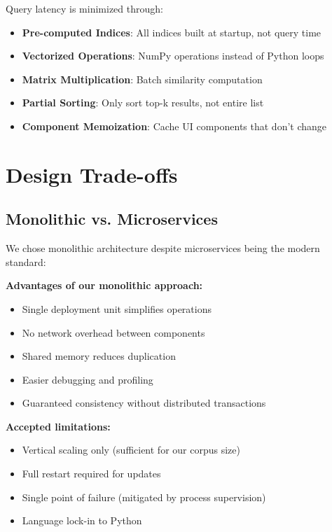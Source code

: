 Query latency is minimized through:

\begin{itemize}[leftmargin=*,itemsep=2pt,topsep=2pt]
  \item \textbf{Pre-computed Indices}: All indices built at startup, not query time
  \item \textbf{Vectorized Operations}: NumPy operations instead of Python loops
  \item \textbf{Matrix Multiplication}: Batch similarity computation
  \item \textbf{Partial Sorting}: Only sort top-k results, not entire list
  \item \textbf{Component Memoization}: Cache UI components that don't change
\end{itemize}

\section{Design Trade-offs}

\subsection{Monolithic vs. Microservices}

We chose monolithic architecture despite microservices being the modern standard:

\textbf{Advantages of our monolithic approach:}
\begin{itemize}[leftmargin=*,itemsep=2pt,topsep=2pt]
  \item Single deployment unit simplifies operations
  \item No network overhead between components  
  \item Shared memory reduces duplication
  \item Easier debugging and profiling
  \item Guaranteed consistency without distributed transactions
\end{itemize}

\textbf{Accepted limitations:}
\begin{itemize}[leftmargin=*,itemsep=2pt,topsep=2pt]
  \item Vertical scaling only (sufficient for our corpus size)
  \item Full restart required for updates
  \item Single point of failure (mitigated by process supervision)
  \item Language lock-in to Python
\end{itemize}

